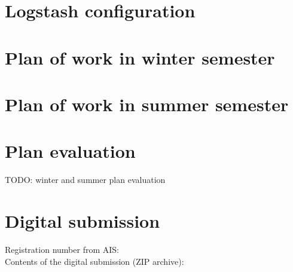 \documentclass[12pt,a4paper,twoside]{report}
\begin{document}
\begin{appendices}
	\chapter{Logstash configuration} \label{appendix:implementation:logstash}
		
	\chapter{Plan of work in winter semester}
			
	\chapter{Plan of work in summer semester}
		
	\chapter{Plan evaluation}
		TODO: winter and summer plan evaluation
	\chapter{Digital submission}
		\noindent Registration number from AIS: \myEvidenceNumber\\
		Contents of the digital submission (ZIP archive):\\
		
\end{appendices}
\end{document}

